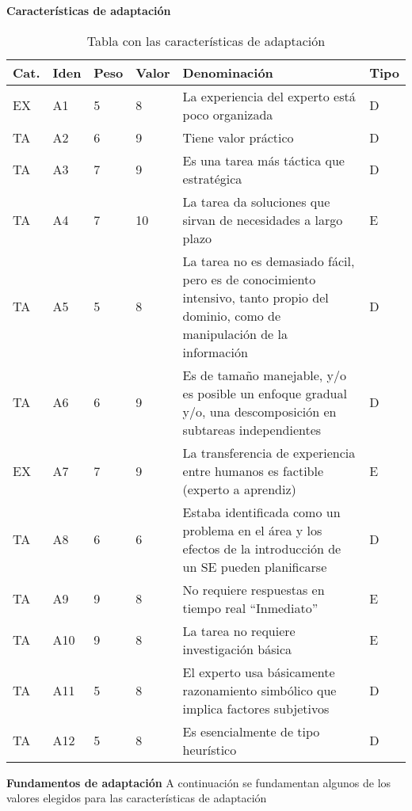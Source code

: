 \textbf{Características de adaptación}
\begin{table}[htb]%
  \centering
  \caption{Tabla con las características de adaptación}
  \label{tab:anchura}
  \begin{tabular}{ | l | l | l | l | p{8cm} | l | }
    \hline
    Cat. & Iden & Peso & Valor & Denominación & Tipo \\ \hline
    EX & A1 & 5 & 8 & La experiencia del experto está poco organizada & D \\ \hline
    TA & A2 & 6 & 9 & Tiene valor práctico & D \\ \hline
    TA & A3 & 7 & 9 & Es una tarea más táctica que estratégica & D \\ \hline
    TA & A4 & 7 & 10 & La tarea da soluciones que sirvan de necesidades a largo plazo & E \\ \hline
    TA & A5 & 5 & 8 & La tarea no es demasiado fácil, pero es de conocimiento intensivo, tanto propio del dominio, como de manipulación de la información & D \\ \hline
    TA & A6 & 6 & 9 & Es de tamaño manejable, y/o es posible un enfoque gradual y/o, una descomposición en subtareas independientes & D \\ \hline
    EX & A7 & 7 & 9 & La transferencia de experiencia entre humanos es factible (experto a aprendiz) & E \\ \hline
    TA & A8 & 6 & 6 & Estaba identificada como un problema en el área y los efectos de la introducción de un SE pueden planificarse & D \\ \hline
    TA & A9 & 9 & 8 & No requiere respuestas en tiempo real “Inmediato” & E \\ \hline
    TA & A10 & 9 & 8 & La tarea no requiere investigación básica & E \\ \hline
    TA & A11 & 5 & 8 & El experto usa básicamente razonamiento simbólico que implica factores subjetivos & D \\ \hline
    TA & A12 & 5 & 8 & Es esencialmente de tipo heurístico & D \\ \hline
  \end{tabular}
\end{table}

\textbf{Fundamentos de adaptación}
A continuación se fundamentan algunos de los valores elegidos para las características de adaptación

